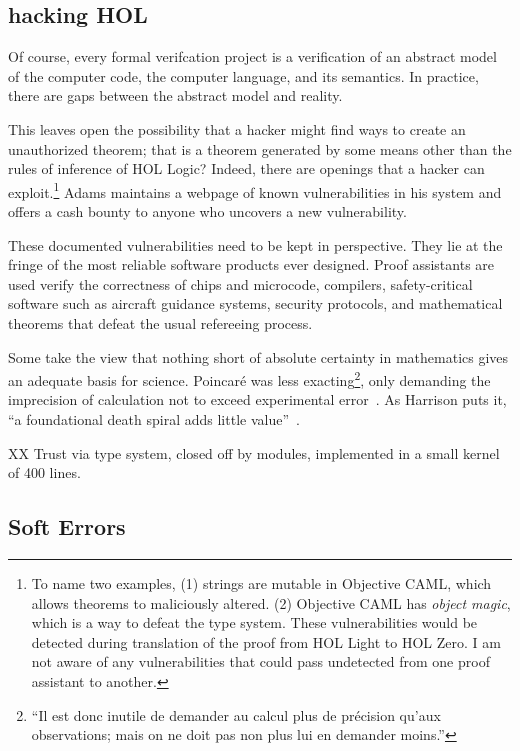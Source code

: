 \documentclass{llncs}
\begin{document}
\subsection{hacking HOL}

Of course, every formal verifcation project is a verification of an
abstract model of the computer code, the computer language, and its
semantics.  In practice, there are gaps between the abstract
model and reality.

  
This leaves open the possibility that a hacker might find ways to
create an unauthorized theorem; that is a theorem generated by some
means other than the rules of inference of HOL Logic?  Indeed, there
are openings that a hacker can exploit.\footnote{To name two examples,
  (1) strings are mutable in Objective CAML, which allows theorems to
  maliciously altered.  (2) Objective CAML has {\it object magic},
  which is a way to defeat the type system.  These vulnerabilities
  would be detected during translation of the proof from HOL Light to
  HOL Zero.  I am not aware of any vulnerabilities that could pass
  undetected from one proof assistant to another.}  Adams maintains a
webpage of known vulnerabilities in his system and offers a cash
bounty to anyone who uncovers a new vulnerability.

These documented vulnerabilities need to be kept in perspective.  They
lie at the fringe of the most reliable software products ever
designed. Proof assistants are used verify the correctness of chips
and microcode, compilers, safety-critical software such as aircraft
guidance systems, security protocols, and mathematical theorems that
defeat the usual refereeing process.  

Some take the view that nothing short of absolute certainty in
mathematics gives an adequate basis for science.  Poincar\'e was less
exacting\footnote{``Il est donc inutile de demander au calcul plus de pr\'ecision
qu'aux observations; mais on ne doit pas non plus lui en demander moins.''}, 
only demanding the imprecision of calculation not to exceed
 experimental error~\cite{HPMC}.  As Harrison puts it, 
``a foundational death spiral adds little value''~\cite{harrison-pm}.



XX Trust via type system, closed off by modules, implemented in a small
kernel of 400 lines.


\subsection{Soft Errors}\label{sec:soft}
\end{document}
